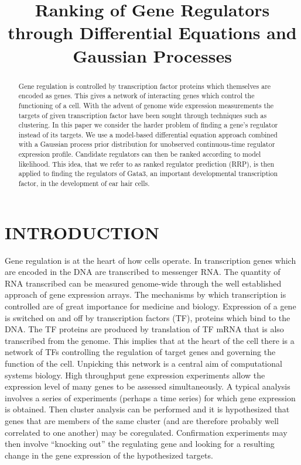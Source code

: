 \documentclass{article}
\title{Ranking of Gene Regulators through Differential Equations and Gaussian Processes}
\begin{document}
\maketitle

\begin{abstract}
  Gene regulation is controlled by transcription factor proteins which
  themselves are encoded as genes. This gives a network of interacting
  genes which  control the functioning of  a cell. With  the advent of
  genome   wide   expression  measurements   the   targets  of   given
  transcription  factor have  been sought  through techniques  such as
  clustering. In this paper we  consider the harder problem of finding
  a  gene's regulator instead  of its  targets.  We  use a  model-based
  differential  equation  approach combined  with  a Gaussian  process
  prior distribution for unobserved continuous-time regulator expression
  profile.  Candidate regulators can then be ranked according to model
  likelihood.  This idea,
  that  we refer  to as  ranked  regulator prediction  (RRP), is  then
  applied   to  finding   the  regulators   of  Gata3,   an  important
  developmental transcription  factor, in the development  of ear hair
  cells.
\end{abstract}

\sloppy

\section{INTRODUCTION}

Gene regulation is at the heart of how cells operate. In transcription
genes  which are  encoded in  the  DNA are  transcribed to  messenger
RNA.  The  quantity of  RNA  transcribed  can  be measured  genome-wide
through the  well established approach of gene  expression arrays. The
mechanisms  by   which  transcription  is  controlled   are  of  great
importance for medicine and biology.  Expression of a gene is switched
on  and off by  transcription factors  (TF), proteins
which bind to the DNA. The  TF proteins are produced by translation of
TF mRNA  that  is  also
transcribed from  the genome.  This implies that  at the heart  of the
cell there is a network of TFs controlling the regulation of target genes and
governing  the function  of  the  cell. Unpicking  this  network is  a
central  aim of  computational systems  biology. High  throughput gene
expression experiments allow the expression  level of many genes to be
assessed  simultaneously.  A typical  analysis  involves  a series  of
experiments  (perhaps a  time  series) for  which  gene expression  is
obtained.  Then   cluster  analysis  can   be  performed  and   it  is
hypothesized that genes that are  members of the same cluster (and are
therefore   probably  well   correlated   to  one   another)  may   be
coregulated.  Confirmation  experiments  may then  involve  ``knocking
out'' the  regulating gene and looking  for a resulting  change in the
gene expression of the hypothesized targets.
\end{document}
